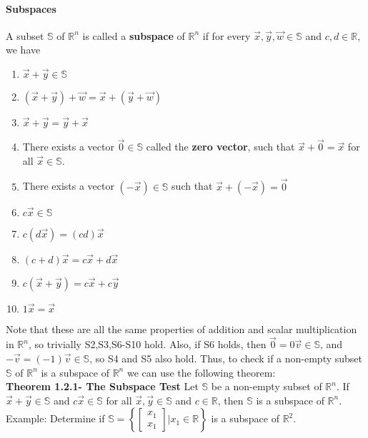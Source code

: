 \documentclass[10pt,letter]{article}
\begin{document}
\paragraph{Subspaces} A subset $\mathbb{S}$ of $\mathbb{R}^n$ is called a \textbf{subspace} of $\mathbb{R}^n$ if for every $\vec{x},\vec{y},\vec{w}\in\mathbb{S}$ and $c,d\in\mathbb{R}$, we have \begin{enumerate}
    \item $\vec{x}+\vec{y}\in\mathbb{S}$ 
    \item $(\vec{x}+\vec{y})+\vec{w}=\vec{x}+(\vec{y}+\vec{w})$ 
    \item $\vec{x}+\vec{y}=\vec{y}+\vec{x}$ 
    \item There exists a vector $\vec{0}\in\mathbb{S}$ called the \textbf{zero vector}, such that $\vec{x}+\vec{0}=\vec{x}$ for all $\vec{x}\in\mathbb{S}$. 
    \item There exists a vector $(-\vec{x})\in\mathbb{S}$ such that $\vec{x}+(-\vec{x})=\vec{0}$ 
    \item $c\vec{x}\in\mathbb{S}$ 
    \item $c(d\vec{x})=(cd)\vec{x}$ 
    \item $(c+d)\vec{x}=c\vec{x}+d\vec{x}$ 
    \item $c(\vec{x}+\vec{y})=c\vec{x}+c\vec{y}$
    \item $1\vec{x}=\vec{x}$
\end{enumerate} 
Note that these are all the same properties of addition and scalar multiplication in $\mathbb{R}^n$, so trivially S2,S3,S6-S10 hold. Also, if S6 holds, then $\vec{0}=0\vec{v}\in\mathbb{S}$, and $-\vec{v}=(-1)\vec{v}\in\mathbb{S}$, so S4 and S5 also hold. Thus, to check if a non-empty subset $\mathbb{S}$ of $\mathbb{R}^n$ is a subspace of $\mathbb{R}^n$ we can use the following theorem: \\ 
\textbf{Theorem 1.2.1- The Subspace Test} Let $\mathbb{S}$ be a non-empty subset of $\mathbb{R}^n$. If $\vec{x}+\vec{y}\in\mathbb{S}$ and $c\vec{x}\in\mathbb{S}$ for all $\vec{x},\vec{y}\in\mathbb{S}$ and $c\in\mathbb{R}$, then $\mathbb{S}$ is a subspace of $\mathbb{R}^n$. \\ 
Example: Determine if $\mathbb{S}=\left\{\begin{bmatrix}x_1\\x_1\end{bmatrix}|x_1\in\mathbb{R}\right\}$ is a subspace of $\mathbb{R}^2$. \\ 
\end{document}
